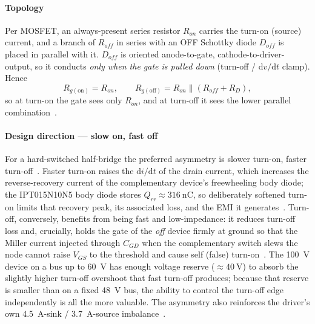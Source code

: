 \documentclass[journal,onecolumn,11pt]{IEEEtran}
\begin{document}
\paragraph{Topology}
Per MOSFET, an always-present series resistor $R_{on}$ carries the turn-on (source) current, and a
branch of $R_{off}$ in series with an OFF Schottky diode $D_{off}$ is placed in parallel with it.
$D_{off}$ is oriented anode-to-gate, cathode-to-driver-output, so it conducts \emph{only when the
gate is pulled down} (turn-off / $\mathrm{d}v/\mathrm{d}t$ clamp). Hence
\begin{equation}
R_{g(\mathrm{on})} = R_{on}, \qquad R_{g(\mathrm{off})} = R_{on}\parallel(R_{off}+R_{D}),
\end{equation}
so at turn-on the gate sees only $R_{on}$, and at turn-off it sees the lower parallel
combination~\cite{balogh,pmeg4030er}.

\paragraph{Design direction --- slow on, fast off}
For a hard-switched half-bridge the preferred asymmetry is slower turn-on, faster
turn-off~\cite{pmeg4030er,an90059,toshiba_dvdt}. Faster turn-on raises the $\mathrm{d}i/\mathrm{d}t$
of the drain current, which increases the reverse-recovery current of the complementary device's
freewheeling body diode; the IPT015N10N5 body diode stores $Q_{rr}\approx\SI{316}{\nano\coulomb}$,
so deliberately softened turn-on limits that recovery peak, its associated loss, and the EMI it
generates~\cite{ipt015ds,pmeg4030er,an90059}. Turn-off, conversely, benefits from being fast and
low-impedance: it reduces turn-off loss and, crucially, holds the gate of the \emph{off} device
firmly at ground so that the Miller current injected through $C_{GD}$ when the complementary switch
slews the node cannot raise $V_{GS}$ to the threshold and cause self (false)
turn-on~\cite{an90059,toshiba_dvdt}. The \SI{100}{\volt} device on a bus up to \SI{60}{\volt} has
enough voltage reserve ($\approx\SI{40}{\volt}$) to absorb the slightly higher turn-off overshoot
that fast turn-off produces; because that reserve is smaller than on a fixed \SI{48}{\volt} bus, the
ability to control the turn-off edge independently is all the more valuable. The asymmetry also
reinforces the driver's own \SI{4.5}{\ampere}-sink / \SI{3.7}{\ampere}-source
imbalance~\cite{ucc27211}.
\end{document}
